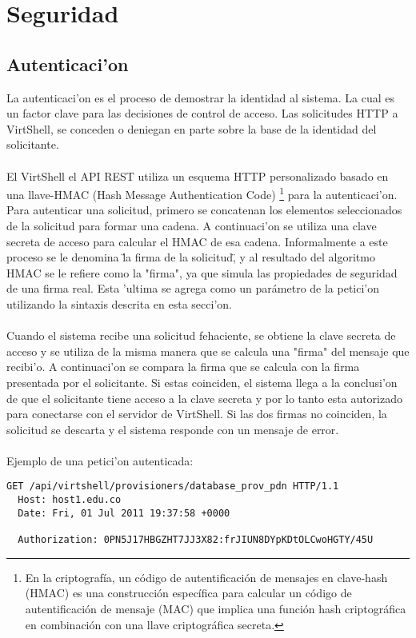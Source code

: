 \chapter{Seguridad}
\label{capseguridad}

\section{Autenticaci'on}
La autenticaci'on es el proceso de demostrar la identidad al sistema. La cual es un factor clave para las decisiones de control de acceso. Las solicitudes HTTP a VirtShell, se conceden o deniegan en parte sobre la base de la identidad del solicitante.\\
\\
El VirtShell el API REST utiliza un esquema HTTP personalizado basado en una llave-HMAC (Hash Message Authentication Code) \footnote{En la criptografía, un código de autentificación de mensajes en clave-hash (HMAC) es una construcción específica para calcular un código de autentificación de mensaje (MAC) que implica una función hash criptográfica en combinación con una llave criptográfica secreta.} para la autenticaci'on. Para autenticar una solicitud, primero se concatenan los elementos seleccionados de la solicitud para formar una cadena. A continuaci'on se utiliza una clave secreta de acceso para calcular el HMAC de esa cadena. Informalmente a este proceso se le denomina \"la firma de la solicitud\", y al resultado del algoritmo HMAC se le refiere como la "firma", ya que simula las propiedades de seguridad de una firma real. Esta 'ultima se agrega como un parámetro de la petici'on utilizando la sintaxis descrita en esta secci'on.\\
\\
Cuando el sistema recibe una solicitud fehaciente, se obtiene la clave secreta de acceso y se utiliza de la misma manera que se calcula una "firma" del mensaje que recibi'o. A continuaci'on se compara la firma que se calcula con la firma presentada por el solicitante. Si estas coinciden, el sistema llega a la conclusi'on de que el solicitante tiene acceso a la clave secreta y por lo tanto esta autorizado para conectarse con el servidor de VirtShell. Si las dos firmas no coinciden, la solicitud se descarta y el sistema responde con un mensaje de error.\\
\\
Ejemplo de una petici'on autenticada:

\medskip
\begin{lstlisting}[style=json, caption=Petición HTTP con firma]
  GET /api/virtshell/provisioners/database_prov_pdn HTTP/1.1
  Host: host1.edu.co
  Date: Fri, 01 Jul 2011 19:37:58 +0000

  Authorization: 0PN5J17HBGZHT7JJ3X82:frJIUN8DYpKDtOLCwoHGTY/45U
\end{lstlisting}

